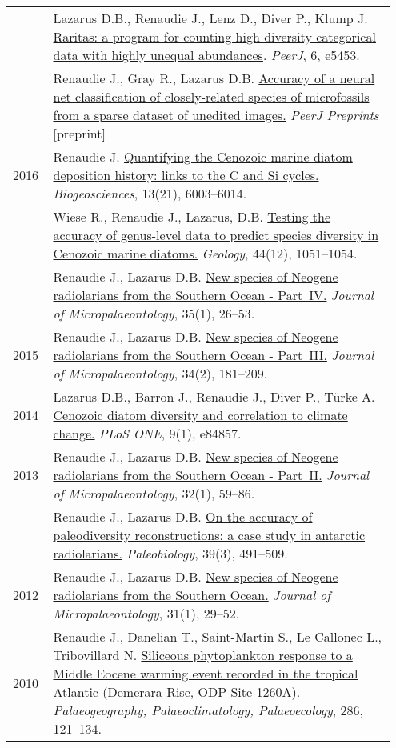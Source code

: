 \documentclass[11pt, a4paper]{article}
\begin{document}
\begin{longtable}{@{}p{0.1\linewidth} >{\small}P{0.85\linewidth}@{}}
    & Lazarus D.B., Renaudie J., Lenz D., Diver P., Klump J. \href{http://dx.doi.org/10.7717/peerj.5453}{Raritas: a program for counting high diversity categorical data with highly unequal abundances}. \textit{PeerJ}, 6, e5453.\\
    & Renaudie J., Gray R., Lazarus D.B. \href{https://peerj.com/preprints/27328/}{Accuracy of a neural net classification of closely-related species of microfossils from a sparse dataset of unedited images.} \textit{PeerJ Preprints} [preprint] \\
2016 & Renaudie J. \href{http://dx.doi.org/10.5194/bg-13-6003-2016}{Quantifying the Cenozoic marine diatom deposition history: links to the C and Si cycles.} \textit{Biogeosciences}, 13(21), 6003--6014.\\
    & Wiese R., Renaudie J., Lazarus, D.B. \href{http://dx.doi.org/10.1130/G38347.1}{Testing the accuracy of genus-level data to predict species diversity in Cenozoic marine diatoms.} \textit{Geology}, 44(12), 1051--1054.\\
    & Renaudie J., Lazarus D.B. \href{http://dx.doi.org/10.1144/jmpaleo2014-026}{New species of Neogene radiolarians from the Southern Ocean - Part IV.} \textit{Journal of Micropalaeontology}, 35(1), 26--53.\\
2015 & Renaudie J., Lazarus D.B. \href{http://dx.doi.org/10.1144/jmpaleo2013-034}{New species of Neogene radiolarians from the Southern Ocean - Part III.} \textit{Journal of Micropalaeontology}, 34(2), 181--209.\\
2014 & Lazarus D.B., Barron J., Renaudie J., Diver P., Türke A. \href{http://dx.doi.org/10.1371/journal.pone.0084857}{Cenozoic diatom diversity and correlation to climate change.} \textit{PLoS ONE}, 9(1), e84857.\\
2013 & Renaudie J., Lazarus D.B. \href{http://dx.doi.org/10.1144/jmpaleo2011-025}{New species of Neogene radiolarians from the Southern Ocean - Part II.} \textit{Journal of Micropalaeontology}, 32(1), 59--86.\\
    & Renaudie J., Lazarus D.B. \href{http://dx.doi.org/10.1666/12016}{On the accuracy of paleodiversity reconstructions: a case study in antarctic radiolarians.} \textit{Paleobiology}, 39(3), 491--509.\\
2012 & Renaudie J., Lazarus D.B. \href{http://dx.doi.org/10.1144/0262-821X10-026}{New species of Neogene radiolarians from the Southern Ocean.} \textit{Journal of Micropalaeontology}, 31(1), 29--52.\\
2010 & Renaudie J., Danelian T., Saint-Martin S., Le Callonec L., Tribovillard N. \href{http://dx.doi.org/10.1016/j.palaeo.2009.12.004}{Siliceous phytoplankton response to a Middle Eocene warming event recorded in the tropical Atlantic (Demerara Rise, ODP Site 1260A).} \textit{Palaeogeography, Palaeoclimatology, Palaeoecology}, 286, 121--134.\\
\end{longtable}
\end{document}
